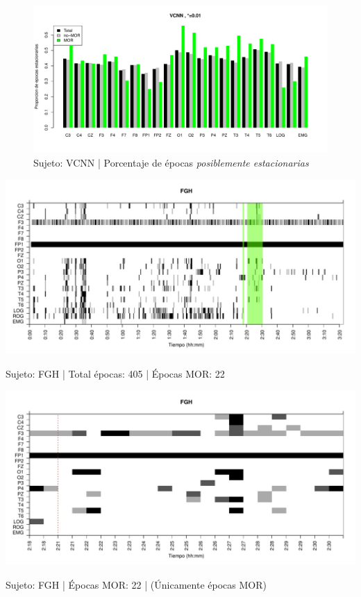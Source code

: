 \begin{figure}
\centering
\includegraphics[width=\linewidth]
{./material_bonito170220/porcentaje_bis/VCNNS1_200_2584_1_bar_porcentaje.pdf} 
\caption{Sujeto: VCNN | Porcentaje de \'epocas \textit{posiblemente estacionarias}}
\end{figure}


\begin{SidewaysFigure}
\centering
\includegraphics[width=\linewidth]
{./material_bonito170220/FGHSUE_22_mor22_tot405_est_total.pdf} 
\caption{Sujeto: FGH | Total \'epocas: 405 | \'Epocas MOR: 22}
\end{SidewaysFigure}
\begin{SidewaysFigure}
\centering
\includegraphics[width=\linewidth]
{./material_bonito170220/FGHSUE_22_mor22_tot22_est_mor.pdf} 
\caption{Sujeto: FGH | \'Epocas MOR: 22 | (\'Unicamente \'epocas MOR)}
\end{SidewaysFigure}

